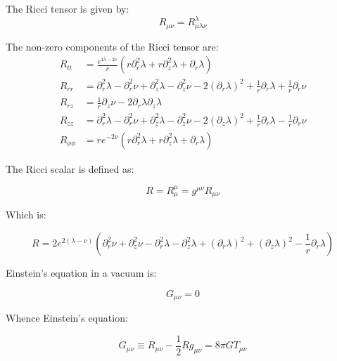 \documentclass[12pt]{article}
\begin{document}
\begin{appendices}
The Ricci tensor is given by:
\begin{equation}
R_{\mu\nu}=R_{\mu\lambda\nu}^{\lambda}
\end{equation}

The non-zero components of the Ricci tensor are:
\begin{equation}
\begin{aligned}
R_{tt}&=\frac{e^{4\lambda-2\nu}}{r}\left(r\partial^{2}_{r}\lambda+r\partial^{2}_{z}\lambda+\partial_{r}\lambda\right)\\
R_{rr}&=\partial^{2}_{r}\lambda-\partial^{2}_{r}\nu+\partial^{2}_{z}\lambda-\partial^{2}_{z}\nu-2\left(\partial_{r}\lambda\right)^{2}+\frac{1}{r}\partial_{r}\lambda+\frac{1}{r}\partial_{r}\nu\\
R_{rz}&=\frac{1}{r}\partial_{z}\nu-2\partial_{r}\lambda\partial_{z}\lambda\\
R_{zz}&=\partial^{2}_{r}\lambda-\partial^{2}_{r}\nu+\partial^{2}_{z}\lambda-\partial^{2}_{z}\nu-2\left(\partial_{z}\lambda\right)^{2}+\frac{1}{r}\partial_{r}\lambda-\frac{1}{r}\partial_{r}\nu\\
R_{\phi\phi}&=re^{-2\nu}\left(r\partial^{2}_{r}\lambda+r\partial^{2}_{z}\lambda+\partial_{r}\lambda\right)
\end{aligned}
\label{eq:ricci-tensor-components}
\end{equation}

The Ricci scalar is defined as:

\begin{equation}
R=R_{\mu}^{\mu}=g^{\mu\nu}R_{\mu\nu}
\end{equation}

Which is:

\begin{equation}
R=2e^{2\left(\lambda-\nu\right)}\left(\partial^{2}_{r}\nu+\partial^{2}_{z}\nu-\partial^{2}_{r}\lambda-\partial^{2}_{z}\lambda+\left(\partial_{r}\lambda\right)^{2}+\left(\partial_{z}\lambda\right)^{2}-\frac{1}{r}\partial_{r}\lambda\right)\label{eq:R}
\end{equation}

Einstein's equation in a vacuum is:

\begin{equation}
\label{eq:einstein-vacuum-equation}
G_{\mu\nu}=0
\end{equation}

Whence Einstein's equation:

\begin{equation}
G_{\mu\nu}\equiv R_{\mu\nu}-\frac{1}{2}Rg_{\mu\nu}=8\pi GT_{\mu\nu}
\label{eq:einstein}
\end{equation}


\end{appendices}
\end{document}
